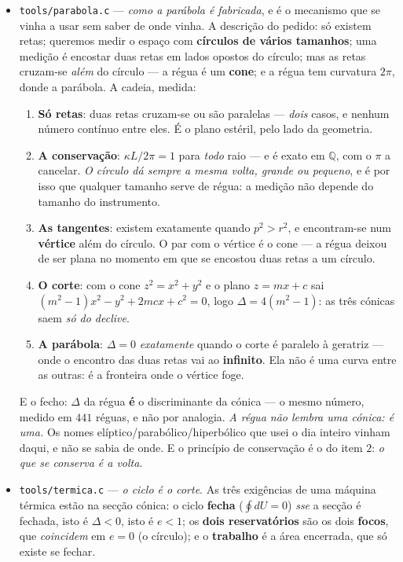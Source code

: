 \documentclass[11pt]{article}
\newcommand{\code}[1]{\texttt{\small #1}}
\newcommand{\Q}{\mathbb Q}
\theoremstyle{plain}
\theoremstyle{remark}
\begin{document}
\begin{itemize}
\emph{O teste que desfaz a coincidência é o mais simples que há: subir o grau e ver se o número
sobe junto.}
\item \code{tools/parabola.c} --- \emph{como a parábola é fabricada}, e é o mecanismo que se
vinha a usar sem saber de onde vinha. A descrição do pedido: só existem retas; queremos medir o
espaço com \textbf{círculos de vários tamanhos}; uma medição é encostar duas retas em lados
opostos do círculo; mas as retas cruzam-se \emph{além} do círculo --- a régua é um \textbf{cone};
e a régua tem curvatura $2\pi$, donde a parábola. A cadeia, medida:

\begin{enumerate}
\item \textbf{Só retas}: duas retas cruzam-se ou são paralelas --- \emph{dois} casos, e nenhum
número contínuo entre eles. É o plano estéril, pelo lado da geometria.
\item \textbf{A conservação}: $\kappa L / 2\pi = 1$ para \emph{todo} raio --- e é exato em $\Q$,
com o $\pi$ a cancelar. \emph{O círculo dá sempre a mesma volta, grande ou pequeno}, e é por isso
que qualquer tamanho serve de régua: a medição não depende do tamanho do instrumento.
\item \textbf{As tangentes}: existem exatamente quando $p^2 > r^2$, e encontram-se num
\textbf{vértice} além do círculo. O par com o vértice é o cone --- a régua deixou de ser plana no
momento em que se encostou duas retas a um círculo.
\item \textbf{O corte}: com o cone $z^2 = x^2+y^2$ e o plano $z = mx+c$ sai
$(m^2-1)x^2 - y^2 + 2mcx + c^2 = 0$, logo $\Delta = 4(m^2-1)$: as três cónicas saem \emph{só do
declive}.
\item \textbf{A parábola}: $\Delta = 0$ \emph{exatamente} quando o corte é paralelo à geratriz ---
onde o encontro das duas retas vai ao \textbf{infinito}. Ela não é uma curva entre as outras: é a
fronteira onde o vértice foge.
\end{enumerate}

E o fecho: $\Delta$ da régua \textbf{é} o discriminante da cónica --- o mesmo número, medido em
$441$ réguas, e não por analogia. \emph{A régua não lembra uma cónica: é uma.} Os nomes
elíptico/parabólico/hiperbólico que usei o dia inteiro vinham daqui, e não se sabia de onde. E o
princípio de conservação é o do item $2$: \emph{o que se conserva é a volta}.
\item \code{tools/termica.c} --- \emph{o ciclo é o corte}. As três exigências de uma máquina
térmica estão na secção cónica: o ciclo \textbf{fecha} ($\oint dU = 0$) \emph{sse} a secção é
fechada, isto é $\Delta<0$, isto é $e<1$; os \textbf{dois reservatórios} são os dois \textbf{focos},
que \emph{coincidem} em $e=0$ (o círculo); e o \textbf{trabalho} é a área encerrada, que só existe
se fechar.


\end{itemize}
\end{document}
